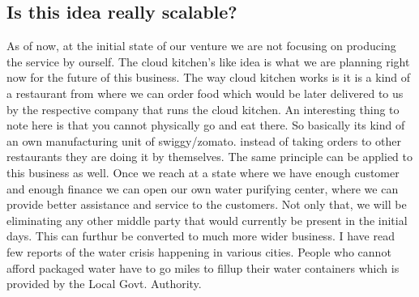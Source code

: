 \documentclass[a4paper, 12pt]{article}
\begin{document}
\subsection*{Is this idea really scalable?}
As of now, at the initial state of our venture we are not focusing on producing the service by ourself. The cloud kitchen's like idea is what we are planning right now
for the future of this business. The way cloud kitchen works is it is a kind of a restaurant from where we can order food which would be later delivered to us by the 
respective company that runs the cloud kitchen. An interesting thing to note here is that you cannot physically go and eat there. So basically its kind of an own manufacturing
unit of swiggy/zomato. instead of taking orders to other restaurants they are doing it by themselves. The same principle can be applied to this business as well. Once
we reach at a state where we have enough customer and enough finance we can open our own water purifying center, where we can provide better assistance and service to the
customers. Not only that, we will be eliminating any other middle party that would currently be present in the initial days. This can furthur be converted to much more 
wider business. I have read few reports of the water crisis happening in various cities. People who cannot afford packaged water have to go miles to fillup their water containers
which is provided by the Local Govt. Authority. 
\end{document}
